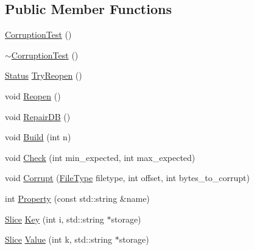\subsection*{Public Member Functions}
\begin{DoxyCompactItemize}
\item 
\mbox{\hyperlink{classleveldb_1_1_corruption_test_a9940767db260b1e4e60b8bcedc50217c}{Corruption\+Test}} ()
\item 
\mbox{\hyperlink{classleveldb_1_1_corruption_test_a4086f02f771d78d4ce242c14b0e392d9}{$\sim$\+Corruption\+Test}} ()
\item 
\mbox{\hyperlink{classleveldb_1_1_status}{Status}} \mbox{\hyperlink{classleveldb_1_1_corruption_test_aaba7c05f06400ef45d1af5cb95f66a57}{Try\+Reopen}} ()
\item 
void \mbox{\hyperlink{classleveldb_1_1_corruption_test_aa2051faee6b6542d35ebdcf99918a713}{Reopen}} ()
\item 
void \mbox{\hyperlink{classleveldb_1_1_corruption_test_aff36b45496c39a006a14df201ef7d57b}{Repair\+DB}} ()
\item 
void \mbox{\hyperlink{classleveldb_1_1_corruption_test_a54d2114311c61356e879b5ccfc3cda18}{Build}} (int n)
\item 
void \mbox{\hyperlink{classleveldb_1_1_corruption_test_aa03dcde1d0771ebbcf7d6ac8bda9c725}{Check}} (int min\+\_\+expected, int max\+\_\+expected)
\item 
void \mbox{\hyperlink{classleveldb_1_1_corruption_test_a22060ac0a3697640cdcf36973339b646}{Corrupt}} (\mbox{\hyperlink{namespaceleveldb_ab8e559ac5cadcb2b5dd531c60df944f1}{File\+Type}} filetype, int offset, int bytes\+\_\+to\+\_\+corrupt)
\item 
int \mbox{\hyperlink{classleveldb_1_1_corruption_test_aab1ed767d1cdac7e95a32ccf6defc709}{Property}} (const std\+::string \&name)
\item 
\mbox{\hyperlink{classleveldb_1_1_slice}{Slice}} \mbox{\hyperlink{classleveldb_1_1_corruption_test_a157c0095fca3c0a2ccaf3b8647705469}{Key}} (int i, std\+::string $\ast$storage)
\item 
\mbox{\hyperlink{classleveldb_1_1_slice}{Slice}} \mbox{\hyperlink{classleveldb_1_1_corruption_test_a0afb6030faf43287b86e027a13eac152}{Value}} (int k, std\+::string $\ast$storage)
\end{DoxyCompactItemize}
